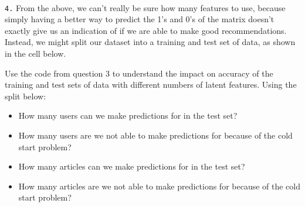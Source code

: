 \documentclass[11pt]{article}
\providecommand{\tightlist}{%
      \setlength{\itemsep}{0pt}\setlength{\parskip}{0pt}}
\begin{document}
    \begin{center}
    \end{center}
    { \hspace*{\fill} \\}
    
    \texttt{4.} From the above, we can't really be sure how many features to
use, because simply having a better way to predict the 1's and 0's of
the matrix doesn't exactly give us an indication of if we are able to
make good recommendations. Instead, we might split our dataset into a
training and test set of data, as shown in the cell below.

Use the code from question 3 to understand the impact on accuracy of the
training and test sets of data with different numbers of latent
features. Using the split below:

\begin{itemize}
\tightlist
\item
  How many users can we make predictions for in the test set?\\
\item
  How many users are we not able to make predictions for because of the
  cold start problem?
\item
  How many articles can we make predictions for in the test set?\\
\item
  How many articles are we not able to make predictions for because of
  the cold start problem?
\end{itemize}
\end{document}
